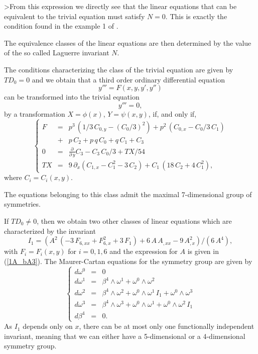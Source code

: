 >From this expression we directly see that the linear equations that 
can be equivalent to the trivial equation must satisfy $N=0$.  
This is exactly the condition found in the example 1 
of \cite{P_Boch1993}. 

The equivalence classes of the linear equations are then determined by the  
value of the so called Laguerre invariant $N$. 

The conditions characterizing the class of the trivial equation are given by
$TD_{0}=0$ and we obtain that a third order ordinary differential equation 
\begin{equation}
y'''=F(x,y,y',y'')
\end{equation}
can be transformed into the trivial equation 
\begin{equation}
y'''=0,
\end{equation}
by a transformation $X=\phi(x)$, $Y=\psi(x,y)$, if, and only if,
\begin{equation}
\label{1AAaaa}
\left\{
\begin{array}{rll}
F&=&p^{3}\,(1/3\,C_{0,y}-(C_{0}/3)^{2})+p^{2}\,(C_{0,x}-C_{0}/3\,C_{1}) \\
&+& p\,C_{2} + p\,q\,C_{0}+ q\,C_{1} + C_{3}\\
0&=&\frac{\partial}{\partial\,y}C_{3}-C_{3}\,C_{0}/3+TX/54 \\
TX&=&9\,\partial_{x}(C_{1,x}-C_{1}^{2}-3\,C_{2})
+C_{1}\,(18\,C_{2}+4\,C_{1}^{2}),
\end{array} \right.
\end{equation}
where $C_{i}=C_{i}(x,y)$.

The equations belonging to this class admit the maximal 7-dimensional group 
of symmetries. 

If $TD_{0} \neq 0$, then we obtain two other classes of linear equations which 
are characterized by the invariant
\begin{equation}
I_{1}=(A^{2}\,( - 3\,F_{6,xx} + F_{6,x}^{2} + 3\,F_{1}) + 6\,A\,A_{,xx} 
- 9\,A_{,x}^{2})/(6\,A^{4}),
\end{equation}
with $F_{i}=F_{i}(x,y)$ for $i=0,1,6$ and the expression for $A$ is given in 
(\ref{1A_bA3}).
The Maurer-Cartan equations for the symmetry group are given by 
\begin{equation}
\left\{ \begin{array}{lll}
d \omega^{0}&=&0 \\
d \omega^{1}&=&
\beta^{4}  \wedge  \omega^{1} 
+ \omega^{0}  \wedge  \omega^{2} \\
d \omega^{2}&=&
\beta^{4}  \wedge  \omega^{2} 
+ \omega^{0}  \wedge  \omega^{1}\,I_{1} + \omega^{0}  \wedge  \omega^{3} \\
d \omega^{3}&=&
\beta^{4}  \wedge  \omega^{3} 
+ \omega^{0}  \wedge  \omega^{1} + \omega^{0}  \wedge  \omega^{2}\,I_{1} \\
d \beta^{4}&=&0.
\end{array} \right.
\end{equation}
As $I_{1}$ depends only on $x$, there can be at most only one functionally 
independent invariant, meaning that we can either have a 5-dimensional or a 
4-dimensional symmetry group.

